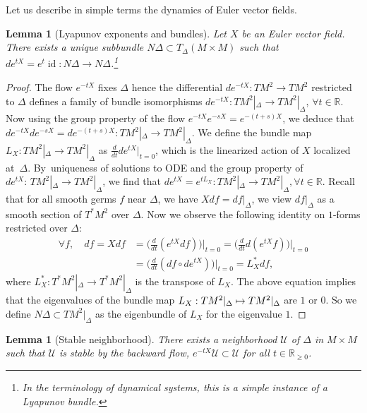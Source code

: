 \documentclass[JEP,XML,SOM,Unicode]{cedram}
\let\pazocal\mathscr
\def\mto{\mathchoice{\longmapsto}{\mapsto}{\mapsto}{\mapsto}}
\newtheorem{lemma}[theorem]{Lemma}
\theoremstyle{definition}
\let\euler X
\DeclareMathOperator\id{id}
\begin{document}
Let us describe in simple terms the dynamics of Euler vector fields.
\begin{lemma}[{Lyapunov exponents and bundles}]
Let $\euler$ be an Euler vector field. There exists a unique subbundle
$N\Delta\subset T_\Delta \left(M\times M\right)$ such that
$de^{t\euler}=e^{t}\id: N\Delta\to N\Delta$.\footnote{In the terminology of dynamical systems, this is a simple instance of a Lyapunov
bundle.}
\end{lemma}

\begin{proof}
The flow $e^{-t\euler}$ fixes $\Delta$
hence the differential $de^{-t\euler}:TM^2\to TM^2$ restric\-ted to $\Delta$ defines a family of bundle isomorphisms
$de^{-t\euler}: T M^2|_\Delta \to T M^2|_\Delta$, $\forall t\in \mathbb{R}$.
Now using the group property of the flow $e^{-t\euler}e^{-s\euler}=e^{-(t+s)\euler}$,
we deduce that $de^{-tX}de^{-sX}=de^{-(t+s)\euler}:T M^2|_\Delta \to T M^2|_\Delta$.
We define the bundle map $L_\euler:T M^2|_\Delta \to T M^2|_\Delta$ as
$\frac{d}{dt}de^{t\euler}|_{t=0}$, which is the linearized action of $\euler$ localized at~$\Delta$. By~uniqueness of solutions to ODE and the group property of \hbox{$de^{t\euler}{:}\,T M^2|_\Delta\!\to\!T M^2|_\Delta$}, we find that $de^{t\euler}=e^{tL_\euler}:T M^2|_\Delta \to T M^2|_\Delta, \forall t\in \mathbb{R}$. Recall that for all smooth germs $f$ near $\Delta$, we have
$Xdf=df|_\Delta$, we view $df|_\Delta$ as a smooth section of $T^*M^2$ over $\Delta$. Now we observe the following identity on $1$-forms restricted over $\Delta$:
\begin{align*}
\forall f,\quad df=
\euler df&= \Big(\frac{d}{dt}
\left(e^{t\euler}df\right)\Big)\big|_{t=0}=\Big(\frac{d}{dt}
d\left(e^{t\euler}f\right)\Big)\big|_{t=0}\\
&=\Big(\frac{d}{dt}
\left(df\circ de^{t\euler}\right)\Big)\big|_{t=0}=L_\euler^* df,
\end{align*}
where $L_\euler^*:T^*M^2|_\Delta\to T^*M^2|_\Delta$ is the transpose of {$L_\euler$}.
The above equation implies that the eigenvalues of the bundle map $L_\euler:TM^2|_\Delta\mto TM^2|_\Delta$ are {$1$ or $0$}. So we define $N\Delta\subset TM^2|_\Delta$ as the eigenbundle of $L_\euler$ for the eigenvalue $1$.
\end{proof}

\begin{lemma}[Stable neighborhood]\label{l:stable}
There exists a neighborhood $\pazocal{U}$ of $\Delta$ in $M\times M$ such that $\pazocal{U}$ is stable by the backward flow, \ie $e^{-t\euler}\pazocal{U}\subset \pazocal{U}$ for all $t\in \mathbb{R}_{\geqslant 0}$.
\end{lemma}
\end{document}
